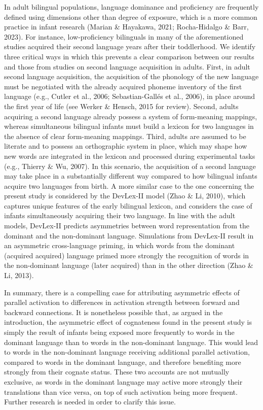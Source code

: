 \documentclass[
  12pt,
  b5paperpaper,
  twoside]{scrreprt}
\begin{document}
In adult bilingual populations, language dominance and proficiency are
frequently defined using dimensions other than degree of exposure, which
is a more common practice in infant research (Marian \& Hayakawa, 2021;
Rocha-Hidalgo \& Barr, 2023). For instance, low-proficiency bilinguals
in many of the aforementioned studies acquired their second language
years after their toddlerhood. We identify three critical ways in which
this prevents a clear comparison between our results and those from
studies on second language acquisition in adults. First, in adult second
language acquisition, the acquisition of the phonology of the new
language must be negotiated with the already acquired phoneme inventory
of the first language (e.g., Cutler et al., 2006; Sebastian-Gallés et
al., 2006), in place around the first year of life (see Werker \&
Hensch, 2015 for review). Second, adults acquiring a second language
already possess a system of form-meaning mappings, whereas simultaneous
bilingual infants must build a lexicon for two languages in the absence
of clear form-meaning mappings. Third, adults are assumed to be literate
and to possess an orthographic system in place, which may shape how new
words are integrated in the lexicon and processed during experimental
tasks (e.g., Thierry \& Wu, 2007). In this scenario, the acquisition of
a second language may take place in a substantially different way
compared to how bilingual infants acquire two languages from birth. A
more similar case to the one concerning the present study is considered
by the DevLex-II model (Zhao \& Li, 2010), which captures unique
features of the early bilingual lexicon, and considers the case of
infants simultaneously acquiring their two language. In line with the
adult models, DevLex-II predicts asymmetries between word representation
from the dominant and the non-dominant language. Simulations from
DevLex-II result in an asymmetric cross-language priming, in which words
from the dominant (acquired acquired) language primed more strongly the
recognition of words in the non-dominant language (later acquired) than
in the other direction (Zhao \& Li, 2013).

In summary, there is a compelling case for attributing asymmetric
effects of parallel activation to differences in activation strength
between forward and backward connections. It is nonetheless possible
that, as argued in the introduction, the asymmetric effect of
cognateness found in the present study is simply the result of infants
being exposed more frequently to words in the dominant language than to
words in the non-dominant language. This would lead to words in the
non-dominant language receiving additional parallel activation, compared
to words in the dominant language, and therefore benefiting more
strongly from their cognate status. These two accounts are not mutually
exclusive, as words in the dominant language may active more strongly
their translations than vice versa, on top of such activation being more
frequent. Further research is needed in order to clarify this issue.
\end{document}
